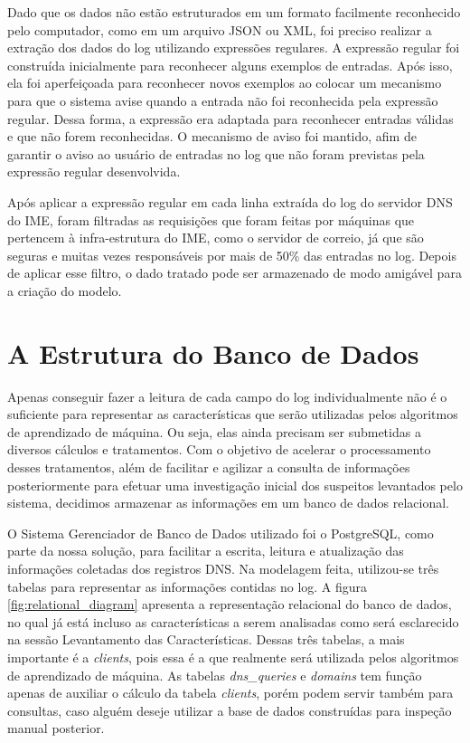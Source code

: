 Dado que os dados não estão estruturados em um formato facilmente reconhecido pelo computador, como em um arquivo JSON ou XML, foi preciso realizar a extração dos dados do log utilizando expressões regulares. A expressão regular foi construída inicialmente para reconhecer alguns exemplos de entradas. Após isso, ela foi aperfeiçoada para reconhecer novos exemplos ao colocar um mecanismo para que o sistema avise quando a entrada não foi reconhecida pela expressão regular. Dessa forma, a expressão era adaptada para reconhecer entradas válidas e que não forem reconhecidas. O mecanismo de aviso foi mantido, afim de garantir o aviso ao usuário de entradas no log que não foram previstas pela expressão regular desenvolvida.

Após aplicar a expressão regular em cada linha extraída do log do servidor DNS do IME, foram filtradas as requisições que foram feitas por máquinas que pertencem à infra-estrutura do IME, como o servidor de correio, já que são seguras e muitas vezes responsáveis por mais de 50\% das entradas no log. Depois de aplicar esse filtro, o dado tratado pode ser armazenado de modo amigável para a criação do modelo.

\section{A Estrutura do Banco de Dados}
Apenas conseguir fazer a leitura de cada campo do log individualmente não é o suficiente para representar as características que serão utilizadas pelos algoritmos de aprendizado de máquina. Ou seja, elas ainda precisam ser submetidas a diversos cálculos e tratamentos. Com o objetivo de acelerar o processamento desses tratamentos, além de facilitar e agilizar a consulta de informações posteriormente para efetuar uma investigação inicial dos suspeitos levantados pelo sistema, decidimos armazenar as informações em um banco de dados relacional.

O Sistema Gerenciador de Banco de Dados utilizado foi o PostgreSQL, como parte da nossa solução, para facilitar a escrita, leitura e atualização das informações coletadas dos registros DNS. Na modelagem feita, utilizou-se três tabelas para representar as informações contidas no log. A figura \ref{fig:relational_diagram} apresenta a representação relacional do banco de dados, no qual já está incluso as características a serem analisadas como será esclarecido na sessão Levantamento das Características. Dessas três tabelas, a mais importante é a \textit{clients}, pois essa é a que realmente será utilizada pelos algoritmos de aprendizado de máquina. As tabelas \textit{dns\_queries} e \textit{domains} tem função apenas de auxiliar o cálculo da tabela \textit{clients}, porém podem servir também para consultas, caso alguém deseje utilizar a base de dados construídas para inspeção manual posterior.

